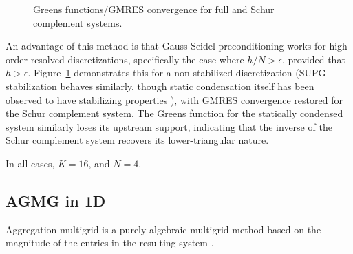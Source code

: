 \documentclass[final,leqno]{siamltex}
\begin{document}
\begin{figure}
\caption{Greens functions/GMRES convergence for full and Schur complement systems.}
\label{fig:gmres_HO_GS}
\end{figure}

An advantage of this method is that Gauss-Seidel preconditioning works for high order resolved discretizations, specifically the case where $h/N > \epsilon$, provided that $h > \epsilon$.  Figure~\ref{fig:gmres_HO_GS} demonstrates this for a non-stabilized discretization (SUPG stabilization behaves similarly, though static condensation itself has been observed to have stabilizing properties \cite{Cai14}), with GMRES convergence restored for the Schur complement system.  The Greens function for the statically condensed system similarly loses its upstream support, indicating that the inverse of the Schur complement system recovers its lower-triangular nature.  

In all cases, $K = 16$, and $N=4$.

\subsection{AGMG in 1D}

Aggregation multigrid is a purely algebraic multigrid method based on the magnitude of the entries in the resulting system \cite{notay2010aggregation}.  
\end{document}
